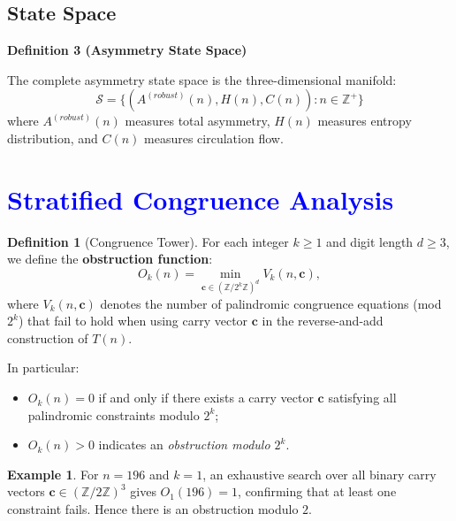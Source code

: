 \documentclass[11pt,a4paper]{article}
\theoremstyle{plain}
\theoremstyle{definition}
\newtheorem{definition}[theorem]{Definition}
\newtheorem{example}[theorem]{Example}
\newenvironment{definitionbox}
    {\begin{center}\begin{minipage}{0.95\textwidth}\color{blue}\bfseries}
    {\end{minipage}\end{center}}
\begin{document}
\subsection{State Space}

\begin{definitionbox}
\textbf{Definition 3 (Asymmetry State Space)}\label{def:state_space}

The complete asymmetry state space is the three-dimensional manifold:
\[
\mathcal{S} = \{(A^{(robust)}(n), H(n), C(n)) : n \in \mathbb{Z}^+\}
\]
where $A^{(robust)}(n)$ measures total asymmetry, $H(n)$ measures entropy distribution, and $C(n)$ measures circulation flow.
\end{definitionbox}

\section{\textcolor{blue}{Stratified Congruence Analysis}}

\begin{definition}[Congruence Tower]
For each integer $k \ge 1$ and digit length $d \ge 3$, 
we define the \textbf{obstruction function}:
\[
O_k(n)
  = \min_{\mathbf{c} \in (\mathbb{Z}/2^k\mathbb{Z})^d}
     V_k(n, \mathbf{c}),
\]
where $V_k(n, \mathbf{c})$ denotes the number of palindromic 
congruence equations (mod $2^k$) that fail to hold when using
carry vector $\mathbf{c}$ in the reverse-and-add construction of $T(n)$.

In particular:
\begin{itemize}
\item $O_k(n) = 0$ if and only if there exists a carry vector 
$\mathbf{c}$ satisfying all palindromic constraints modulo $2^k$;
\item $O_k(n) > 0$ indicates an \emph{obstruction modulo $2^k$}.
\end{itemize}
\end{definition}

\begin{example}
For $n = 196$ and $k=1$, an exhaustive search over all 
binary carry vectors $\mathbf{c} \in (\mathbb{Z}/2\mathbb{Z})^3$
gives $O_1(196) = 1$, confirming that at least one constraint fails.
Hence there is an obstruction modulo $2$.
\end{example}
\end{document}
